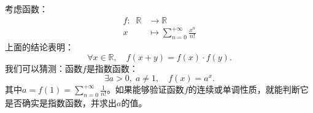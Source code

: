 \documentclass[12pt,UTF8,fontset=none]{ctexbook}
\begin{document}
考虑函数：
\begin{align*}
    f:\;\; \mathbb{R} &\rightarrow \mathbb{R} \\
    x &\mapsto \sum_{n=0}^{+\infty} \frac{x^n}{n!}
\end{align*}
上面的结论表明：
$$ \forall x \in \mathbb{R}, \quad f(x + y) = f(x) \cdot f(y). $$
我们可以猜测：函数$f$是指数函数：
$$ \exists a > 0, \; a\neq 1, \quad f(x) = a^x. $$
其中$a = f(1) = \sum_{n=0}^{+\infty} \frac{1}{n!}$。如果能够验证函数$f$的连续或单调性质，就能判断它是否确实是指数函数，并求出$a$的值。


\end{document}
